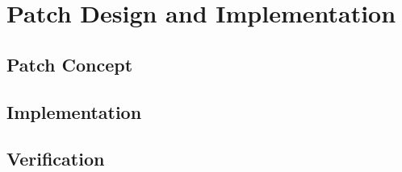 \section{Patch Design and Implementation}

\subsection{Patch Concept}

\subsection{Implementation}

\subsection{Verification}
